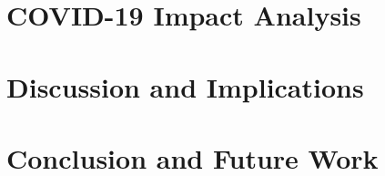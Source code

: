 \documentclass[runningheads]{llncs}
\begin{document}
\section{COVID-19 Impact Analysis}

\section{Discussion and Implications}

\section{Conclusion and Future Work}

%
%
%



%
%
%
%
%
\end{document}
